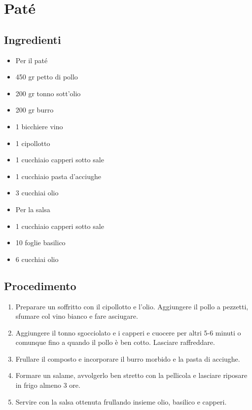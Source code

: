 \section{Paté}
\subsection{Ingredienti}
\begin{itemize}
\item Per il paté  
\item 450 gr petto di pollo  
\item 200 gr tonno sott'olio  
\item 200 gr burro  
\item 1 bicchiere vino  
\item 1 cipollotto  
\item 1 cucchiaio capperi sotto sale  
\item 1 cucchiaio pasta d'acciughe  
\item 3 cucchiai olio  
\item Per la salsa  
\item 1 cucchiaio capperi sotto sale  
\item 10 foglie basilico  
\item 6 cucchiai olio
\end{itemize}
\subsection{Procedimento}
\begin{enumerate}
\item  Preparare un soffritto con il cipollotto e l'olio. Aggiungere il pollo a pezzetti, sfumare col vino bianco e fare asciugare.  
\item  Aggiungere il tonno sgocciolato e i capperi e cuocere per altri 5-6 minuti o comunque fino a quando il pollo è ben cotto. Lasciare raffreddare.   
\item  Frullare il composto e incorporare il burro morbido e la pasta di acciughe.   
\item  Formare un salame, avvolgerlo ben stretto con la pellicola e lasciare riposare in frigo almeno 3 ore.  
\item  Servire con la salsa ottenuta frullando insieme olio, basilico e capperi.
\end{enumerate}
